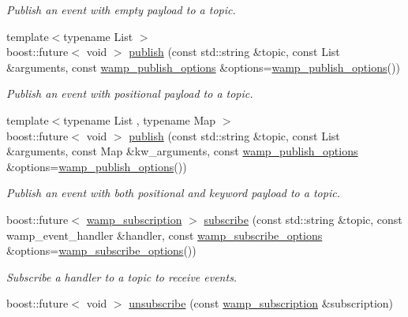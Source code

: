 \begin{DoxyCompactItemize}
\begin{DoxyCompactList}\small\item\em Publish an event with empty payload to a topic. \end{DoxyCompactList}\item 
{\footnotesize template$<$typename List $>$ }\\boost\+::future$<$ void $>$ \hyperlink{group___p_u_b_ga9ca2b82c99816275b2f13dff14facbb9}{publish} (const std\+::string \&topic, const List \&arguments, const \hyperlink{classautobahn_1_1wamp__publish__options}{wamp\+\_\+publish\+\_\+options} \&options=\hyperlink{classautobahn_1_1wamp__publish__options}{wamp\+\_\+publish\+\_\+options}())
\begin{DoxyCompactList}\small\item\em Publish an event with positional payload to a topic. \end{DoxyCompactList}\item 
{\footnotesize template$<$typename List , typename Map $>$ }\\boost\+::future$<$ void $>$ \hyperlink{group___p_u_b_ga7d40d4e66b27abc1459bdd3abc18e0bc}{publish} (const std\+::string \&topic, const List \&arguments, const Map \&kw\+\_\+arguments, const \hyperlink{classautobahn_1_1wamp__publish__options}{wamp\+\_\+publish\+\_\+options} \&options=\hyperlink{classautobahn_1_1wamp__publish__options}{wamp\+\_\+publish\+\_\+options}())
\begin{DoxyCompactList}\small\item\em Publish an event with both positional and keyword payload to a topic. \end{DoxyCompactList}\item 
boost\+::future$<$ \hyperlink{classautobahn_1_1wamp__subscription}{wamp\+\_\+subscription} $>$ \hyperlink{classautobahn_1_1wamp__session_a3979afb4fef6801d9fe12a9c09183b27}{subscribe} (const std\+::string \&topic, const wamp\+\_\+event\+\_\+handler \&handler, const \hyperlink{classautobahn_1_1wamp__subscribe__options}{wamp\+\_\+subscribe\+\_\+options} \&options=\hyperlink{classautobahn_1_1wamp__subscribe__options}{wamp\+\_\+subscribe\+\_\+options}())
\begin{DoxyCompactList}\small\item\em Subscribe a handler to a topic to receive events. \end{DoxyCompactList}\item 
boost\+::future$<$ void $>$ \hyperlink{classautobahn_1_1wamp__session_a3f83202670838318dbec10eb4ec622b5}{unsubscribe} (const \hyperlink{classautobahn_1_1wamp__subscription}{wamp\+\_\+subscription} \&subscription)

\end{DoxyCompactItemize}
